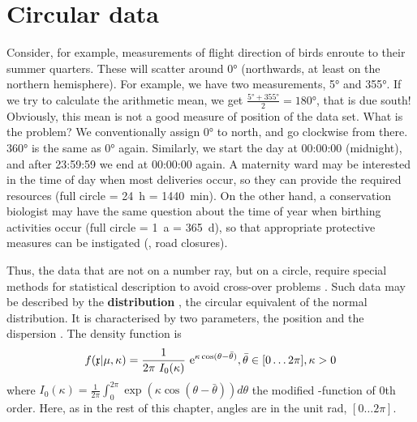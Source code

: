 \chapter{Circular data}
\begin{refsection}
\label{text:circular}


Consider, for example, measurements of flight direction of birds enroute to their summer quarters. These will scatter around \ang{0} (northwards, at least on the northern hemisphere). For example, we have two measurements, \ang{5} and \ang{355}. If we try to calculate the arithmetic mean, we get \( \frac{\ang{5} + \ang{355}}{2} = \ang{180} \), that is due south! Obviously, this mean is not a good measure of position of the data set. What is the problem?  We conventionally assign \ang{0} to north, and go clockwise from there. \ang{360} is the same as \ang{0} again. Similarly, we start the day at 00:00:00 (midnight), and after 23:59:59 we end at 00:00:00 again. A maternity ward may be interested in the time of day when most deliveries occur, so they can provide the required resources (full circle = \SI{24}{h} = \SI{1440}{min}). On the other hand, a conservation biologist may have the same question about the time of year when birthing activities occur (full circle = \SI{1}{a} = \SI{365}{d}), so that appropriate protective measures can be instigated (, road closures).

Thus, the data that are not on a number ray, but on a circle, require special methods for statistical description to avoid cross-over problems \parencite{Bat-81, Fis-93, Ber-09}. Such data may be described by the \textbf{ distribution} \parencite{Mie-18}, the circular equivalent of the normal distribution. It is characterised by two parameters, the position \skalar{\mu} and the dispersion \skalar{\kappa}. The density function is
\begin{equation}
  f(\AbsVec{x} | \mu,\kappa) = \frac{1}{2\pi\ I_0(\kappa)}\ \mathrm{e}^{\kappa \cos(\theta-\bar{\theta})}, \bar{\theta} \in [0\ldots 2\pi], \kappa > 0
\end{equation}
where \( I_0(\kappa) = \frac{1}{2\pi} \int_{0}^{2\pi} \exp(\kappa \cos(\theta - \bar{\theta})) d\theta \) the modified -function of 0th order. Here, as in the rest of this chapter, angles are in the unit \si{rad}, \( [0\ldots 2\pi] \).


\end{refsection}
